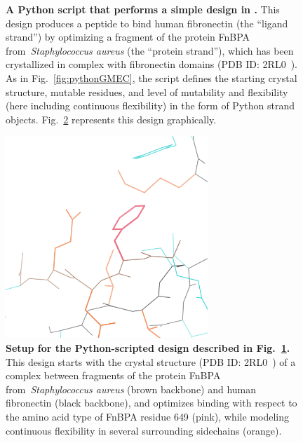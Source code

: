 \begin{figure}
\vspace{-0.7in}
\resizebox{\textwidth}{!}
{
	
}
\caption{\textbf{A Python script that performs a simple \bbks design in .}  This design produces a peptide to bind human fibronectin (the ``ligand strand'') by optimizing a fragment of the protein FnBPA from~\textit{Staphylococcus aureus} (the ``protein strand''), which has been crystallized in complex with fibronectin domains (PDB ID: 2RL0~\cite{2RL0}).  As in Fig.~\ref{fig:pythonGMEC}, the script defines the starting crystal structure, mutable residues, and level of mutability and flexibility (here including continuous flexibility) in the form of Python strand objects.   Fig.~\ref{fig:pythonBBKSpic} represents this design graphically.  }
\label{fig:pythonBBKS}
\end{figure}

\begin{figure}
\includegraphics[width=3in]{figures/python_bbks_pic.png}
\caption{\textbf{Setup for the Python-scripted \bbks design described in Fig.~\ref{fig:pythonBBKS}.}  This design starts with the crystal structure (PDB ID: 2RL0~\cite{2RL0}) of a complex between fragments of the protein FnBPA from~\textit{Staphylococcus aureus} (brown backbone) and human fibronectin (black backbone), and optimizes binding with respect to the amino acid type of FnBPA residue 649 (pink), while modeling continuous flexibility in several surrounding sidechains (orange).  }
\label{fig:pythonBBKSpic}
\end{figure}